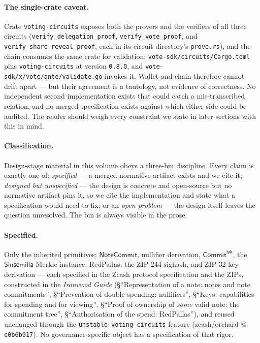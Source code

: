 \documentclass[11pt,a4paper]{article}
\theoremstyle{definition}
\newcommand{\NoteCommit}{\ensuremath{\mathsf{NoteCommit}}}
\newcommand{\Sinsemilla}{\ensuremath{\mathsf{Sinsemilla}}}
\newcommand{\CommitIvk}{\ensuremath{\mathsf{Commit}^{\mathsf{ivk}}}}
\begin{document}
\paragraph{The single-crate caveat.} Crate \texttt{voting-circuits} exposes
both the provers and the verifiers of all three circuits
(\texttt{verify\_delegation\_proof}, \texttt{verify\_vote\_proof}, and
\texttt{verify\_share\_reveal\_proof}, each in its circuit directory's
\texttt{prove.rs}), and the
chain consumes the same crate for validation:
\texttt{vote-sdk/circuits/Cargo.toml} pins \texttt{voting-circuits} at
version \texttt{0.8.0}, and \texttt{vote-sdk/x/vote/ante/validate.go}
invokes it. Wallet and chain therefore
cannot drift apart --- but their agreement is a tautology, not evidence of
correctness. No independent second implementation exists that could catch a
mis-transcribed relation, and no merged specification exists against which
either side could be audited. The reader should weigh every constraint we
state in later sections with this in mind.

\paragraph{Classification.} Design-stage material in this volume obeys a
three-bin discipline. Every claim is exactly one of: \emph{specified} --- a
merged normative artifact exists and we cite it; \emph{designed but
unspecified} --- the design is concrete and open-source but no normative
artifact pins it, so we cite the implementation and state what a
specification would need to fix; or an \emph{open problem} --- the design
itself leaves the question unresolved. The bin is always visible in the
prose.

\paragraph{Specified.} Only the inherited primitives: \NoteCommit{},
nullifier derivation, \CommitIvk{}, the \Sinsemilla{} Merkle instance,
RedPallas, the ZIP-244 sighash, and ZIP-32 key derivation --- each specified
in the Zcash protocol specification and the ZIPs, constructed in the
\emph{Ironwood Guide} (\S``Representation of a note: notes and note
commitments'', \S``Prevention of double-spending: nullifiers'', \S``Keys:
capabilities for spending and for viewing'', \S``Proof of ownership of
\emph{some} valid note: the commitment tree'', \S``Authorisation of the
spend: RedPallas''), and reused unchanged through the
\texttt{unstable-voting-circuits} feature (zcash/orchard @
\texttt{c0b6b917}). No governance-specific object has a specification of
that rigor.
\end{document}
